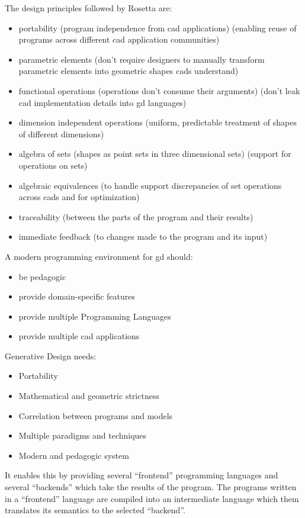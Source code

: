 \documentclass{./llncs2e/llncs}
\begin{document}
	The design principles followed by Rosetta are:
	\begin{itemize}
		\item portability (program independence from \ac{cad} applications) (enabling reuse of programs across different \ac{cad} application communities)
		\item parametric elements (don't require designers to manually transform parametric elements into geometric shapes \ac{cad}s understand)
		\item functional operations (operations don't consume their arguments) (don't leak \ac{cad} implementation details into \ac{gd} languages)
		\item dimension independent operations (uniform, predictable treatment of shapes of different dimensions)
		\item algebra of sets (shapes as point sets in three dimensional sets) (support for operations on sets)
		\item algebraic equivalences (to handle support discrepancies of set operations across \ac{cad}s and for optimization)
		\item traceability (between the parts of the program and their results)
		\item immediate feedback (to changes made to the program and its input)
	\end{itemize}
	
	A modern programming environment for \ac{gd} should:
	\begin{itemize}
		\item be pedagogic
		\item provide domain-specific features
		\item provide multiple Programming Languages
		\item provide multiple \ac{cad} applications
	\end{itemize}
	
	Generative Design needs:
	\begin{itemize}
		\item Portability
		\item Mathematical and geometric strictness
		\item Correlation between programs and models
		\item Multiple paradigms and techniques
		\item Modern and pedagogic system
	\end{itemize}
	
	It enables this by providing several ``frontend'' programming languages and several ``backends'' which take the results of the program. 
	The programs written in a ``frontend'' language are compiled into an intermediate language which them translates its semantics to the selected ``backend''.
	
\end{document}
